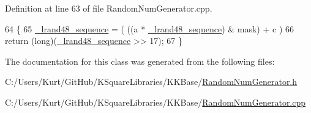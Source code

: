 Definition at line 63 of file Random\+Num\+Generator.\+cpp.


\begin{DoxyCode}
64 \{
65   \hyperlink{_k_k_base_types_8cpp_a9f6516ed195a919be488f0d84b219cc9}{\_lrand48\_sequence} = ( ((a * \hyperlink{_k_k_base_types_8cpp_a9f6516ed195a919be488f0d84b219cc9}{\_lrand48\_sequence}) & mask) + c ) %
66   \textcolor{keywordflow}{return} (\textcolor{keywordtype}{long})(\hyperlink{_k_k_base_types_8cpp_a9f6516ed195a919be488f0d84b219cc9}{\_lrand48\_sequence} >> 17);
67 \}
\end{DoxyCode}


The documentation for this class was generated from the following files\+:\begin{DoxyCompactItemize}
\item 
C\+:/\+Users/\+Kurt/\+Git\+Hub/\+K\+Square\+Libraries/\+K\+K\+Base/\hyperlink{_random_num_generator_8h}{Random\+Num\+Generator.\+h}\item 
C\+:/\+Users/\+Kurt/\+Git\+Hub/\+K\+Square\+Libraries/\+K\+K\+Base/\hyperlink{_random_num_generator_8cpp}{Random\+Num\+Generator.\+cpp}\end{DoxyCompactItemize}
